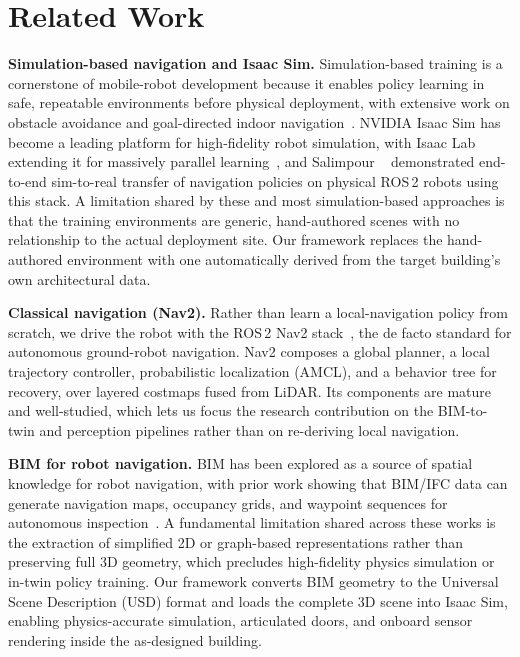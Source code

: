 \documentclass[10pt,twocolumn,letterpaper]{article}
\begin{document}
\section{Related Work}

\noindent\textbf{Simulation-based navigation and Isaac Sim.}
Simulation-based training is a cornerstone of mobile-robot development because it
enables policy learning in safe, repeatable environments before physical
deployment, with extensive work on obstacle avoidance and goal-directed indoor
navigation~\cite{sun2021motion}. NVIDIA Isaac Sim has become a leading platform
for high-fidelity robot simulation, with Isaac Lab extending it for massively
parallel learning~\cite{mittal2025isaaclab}, and Salimpour \etal~\cite{salimpour2025sim2real}
demonstrated end-to-end sim-to-real transfer of navigation policies on physical
ROS\,2 robots using this stack. A limitation shared by these and most
simulation-based approaches is that the training environments are generic,
hand-authored scenes with no relationship to the actual deployment site. Our
framework replaces the hand-authored environment with one automatically derived
from the target building's own architectural data.

\noindent\textbf{Classical navigation (Nav2).}
Rather than learn a local-navigation policy from scratch, we drive the robot with
the ROS\,2 Nav2 stack~\cite{macenski2020marathon2}, the de facto standard for
autonomous ground-robot navigation. Nav2 composes a global planner, a local
trajectory controller, probabilistic localization (AMCL), and a behavior tree for
recovery, over layered costmaps fused from LiDAR. Its components are mature and
well-studied, which lets us focus the research contribution on the BIM-to-twin and
perception pipelines rather than on re-deriving local navigation.

\noindent\textbf{BIM for robot navigation.}
BIM has been explored as a source of spatial knowledge for robot navigation, with
prior work showing that BIM/IFC data can generate navigation maps, occupancy
grids, and waypoint sequences for autonomous
inspection~\cite{palacz2019indoor,labbe2021semantic,gopee2023ifc,chen2024reality}.
A fundamental limitation shared across these works is the extraction of
simplified 2D or graph-based representations rather than preserving full 3D
geometry, which precludes high-fidelity physics simulation or in-twin policy
training. Our framework converts BIM geometry to the Universal Scene Description
(USD) format and loads the complete 3D scene into Isaac Sim, enabling
physics-accurate simulation, articulated doors, and onboard sensor rendering
inside the as-designed building.
\end{document}

